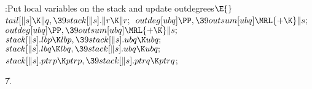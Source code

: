 \B{}:Put local variables on the stack and update
outdegrees\X${}\E{}$\6
$\\{tail}[\|s]\K\|q,\39\\{stack}[\|s].\|r\K\|r;{}$\6
${}\\{outdeg}[\\{ubq}]\PP,\39\\{outsum}[\\{ubq}]\MRL{+{\K}}\|s;{}$\6
${}\\{outdeg}[\\{ubq}]\PP,\39\\{outsum}[\\{ubq}]\MRL{+{\K}}\|s;{}$\6
${}\\{stack}[\|s].\\{lbp}\K\\{lbp},\39\\{stack}[\|s].\\{ubq}\K\\{ubq};{}$\6
${}\\{stack}[\|s].\\{lbq}\K\\{lbq},\39\\{stack}[\|s].\\{ubq}\K\\{ubq};{}$\6
${}\\{stack}[\|s].\\{ptrp}\K\\{ptrp},\39\\{stack}[\|s].\\{ptrq}\K\\{ptrq}{}$;%
\par
\U7.\fi

